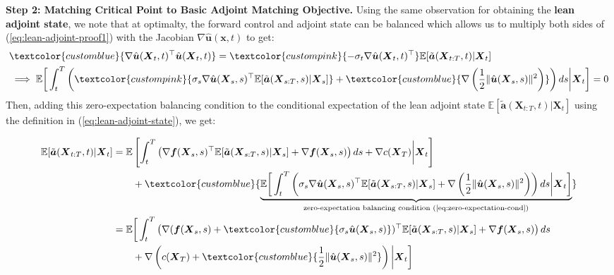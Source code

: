 \documentclass{article}
\newcommand{\bluetext}[1]{\textcolor{customblue}{#1}}
\newcommand{\pinktext}[1]{\textcolor{custompink}{#1}}
\begin{document}
\textbf{Step 2: Matching Critical Point to Basic Adjoint Matching Objective.}
Using the same observation for obtaining the \textbf{lean adjoint state}, we note that at optimalty, the forward control and adjoint state can be balanced which allows us to multiply both sides of (\ref{eq:lean-adjoint-proof1}) with the Jacobian $\nabla \hat{\boldsymbol{u}}(\boldsymbol{x},t)$ to get: 
\begin{align}
    &\bluetext{\nabla \hat{\boldsymbol{u}}(\boldsymbol{X}_t,t)^\top\hat{\boldsymbol{u}}(\boldsymbol{X}_t,t)}=\pinktext{-\sigma_t\nabla \hat{\boldsymbol{u}}(\boldsymbol{X}_t,t)^\top}\mathbb{E}[\tilde{\boldsymbol{a}}(\boldsymbol{X}_{t:T},t)|\boldsymbol{X}_t]\nonumber\\
    &\implies \mathbb{E}\bigg[\int_t^T\left(\pinktext{\sigma_s\nabla \hat{\boldsymbol{u}}(\boldsymbol{X}_s,s)^{\top}\mathbb{E}[\tilde{\boldsymbol{a}}(\boldsymbol{X}_{s:T},s)|\boldsymbol{X}_s]}+\bluetext{\nabla \left(\frac{1}{2}\|\hat{\boldsymbol{u}}(\boldsymbol{X}_s,s)\|^2\right)}\right)ds\bigg|\boldsymbol{X}_t\bigg]=0\label{eq:zero-expectation-cond}
\end{align}
Then, adding this zero-expectation balancing condition to the conditional expectation of the lean adjoint state $\mathbb{E}[\tilde{\boldsymbol{a}}(\boldsymbol{X}_{t:T},t)|\boldsymbol{X}_t]$ using the definition in (\ref{eq:lean-adjoint-state}), we get: 
\begin{small}
\begin{align}
    \mathbb{E}[\tilde{\boldsymbol{a}}(\boldsymbol{X}_{t:T}, t)|\boldsymbol{X}_t]&=\mathbb{E}\left[\int_t^T\left(\nabla \boldsymbol{f}(\boldsymbol{X}_s,s)^\top\mathbb{E}[\tilde{\boldsymbol{a}}(\boldsymbol{X}_{s:T},s)|\boldsymbol{X}_s]+\nabla \boldsymbol{f}(\boldsymbol{X}_s,s)\right)ds+\nabla c(\boldsymbol{X}_T)\bigg|\boldsymbol{X}_t\right]\nonumber\\
    &\quad \quad  +\bluetext{\underbrace{\mathbb{E}\bigg[\int_t^T\left(\sigma_s\nabla \hat{\boldsymbol{u}}(\boldsymbol{X}_s,s)^{\top}\mathbb{E}[\tilde{\boldsymbol{a}}(\boldsymbol{X}_{s:T},s)|\boldsymbol{X}_s]+\nabla \left(\frac{1}{2}\|\hat{\boldsymbol{u}}(\boldsymbol{X}_s,s)\|^2\right)\right)ds\bigg|\boldsymbol{X}_t\bigg]}_{\text{zero-expectation balancing condition (\ref{eq:zero-expectation-cond})}}}\nonumber\\
    &=\mathbb{E}\bigg[\int_t^T\left(\nabla (\boldsymbol{f}(\boldsymbol{X}_s,s)+\bluetext{\sigma_s\hat{\boldsymbol{u}}(\boldsymbol{X}_s,s)})^\top\mathbb{E}[\tilde{\boldsymbol{a}}(\boldsymbol{X}_{s:T},s)|\boldsymbol{X}_s]+\nabla \boldsymbol{f}(\boldsymbol{X}_s,s)\right)ds\nonumber\\
    &\quad \quad +\nabla \left(c(\boldsymbol{X}_T)+\bluetext{\frac{1}{2}\|\hat{\boldsymbol{u}}(\boldsymbol{X}_s,s)\|^2}\right)\bigg|\boldsymbol{X}_t\bigg]
\end{align}
\end{small}
\end{document}
